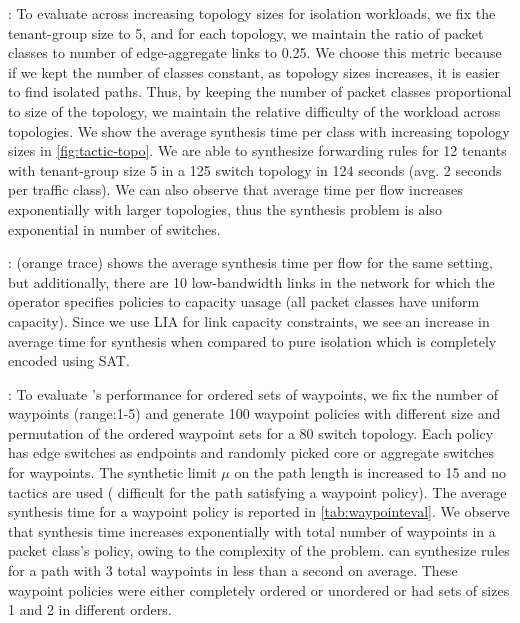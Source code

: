 : To evaluate \Name across
increasing topology sizes for isolation workloads, we fix the
tenant-group size to 5, and for each topology, we maintain the ratio
of packet classes to number of edge-aggregate links to 0.25.  We
choose this metric because if we kept the number of classes constant,
as topology sizes increases, it is easier to find isolated
paths. Thus, by keeping the number of packet classes proportional to
size of the topology, we maintain the relative difficulty of the
workload across topologies.  We show the average synthesis time per
class with increasing topology sizes in
\cref{fig:tactic-topo}.  We are able to synthesize forwarding rules
for 12 tenants with tenant-group size 5 in a 125 switch topology in 124
seconds (avg. 2 seconds per traffic class).
We can also observe that average time per flow increases exponentially
with larger topologies, thus the synthesis problem is also exponential
in number of switches.
  
  
 : 
 (orange trace) shows the average synthesis time per flow for the same setting, but
 additionally, there are 10 low-bandwidth links in the network for which the operator
 specifies policies to capacity uasage (all packet classes have uniform capacity). 
Since we use LIA for link capacity constraints, we see an 
increase in average time for synthesis 
when compared to pure isolation which is completely 
encoded using SAT. 

: To evaluate \Name's performance for
ordered sets of waypoints, we fix the number of waypoints (range:1-5)
and generate 100 waypoint policies with different size and permutation
of the ordered waypoint sets for a 80 switch topology. Each
policy has edge switches as endpoints and randomly picked core or
aggregate switches for waypoints. The synthetic limit $\mu$ on the
path length is increased to 15 and no tactics are used (
difficult for the path satisfying a waypoint policy). The
average synthesis time for a waypoint policy is reported in
\cref{tab:waypointeval}.  We observe that synthesis time increases
exponentially with total number of waypoints in a packet class's
policy, owing to the complexity of the problem.  \Name can synthesize
rules for a path with 3 total waypoints in less than a second on
average. These waypoint policies were either completely ordered or
unordered or had sets of sizes 1 and 2 in different
orders. 

